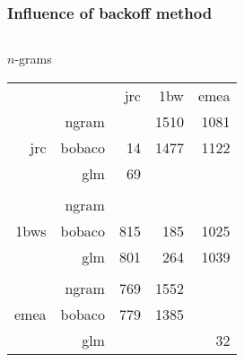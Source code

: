 
\begin{frame}
    \frametitle{Influence of backoff method}

\begin{columns}[T] %
\begin{column}{.5\textwidth}
    \begin{block}{$n$-grams}
    {\small
        \begin{tabular}{rrrrr}
                                  &       & jrc & 1bw  & emea \\ \cline{3-5}
            \multirow{3}{*}{jrc}  & ngram & \cellcolor{green!25}{13}  & 1510 & 1081 \\
                                  & bobaco& 14  & 1477 & 1122 \\
                                  & glm   & 69  & \cellcolor{green!25}{1195} & \cellcolor{green!25}{961}  \\
 &&&& \\
            \multirow{3}{*}{1bws} & ngram & \cellcolor{green!25}{768} & \cellcolor{green!25}{158}  & \cellcolor{green!25}{946}  \\
                                  & bobaco& 815 & 185  & 1025 \\
                                  & glm   & 801 & 264  & 1039 \\ 
 &&&& \\ 
            \multirow{3}{*}{emea} & ngram & 769 & 1552 & \cellcolor{green!25}{4}    \\   
                                  & bobaco& 779 & 1385 & \cellcolor{green!25}{4}    \\
                                  & glm   & \cellcolor{green!25}{600} & \cellcolor{green!25}{1143} & 32
        \end{tabular}
    }
    \end{block}


\end{column}
\end{columns}
\end{frame}

